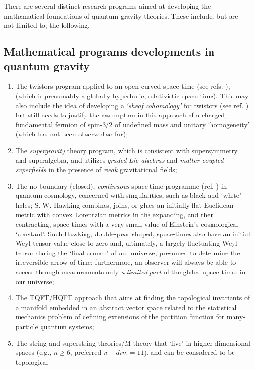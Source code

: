 \documentclass[12pt]{article}
\theoremstyle{plain}
\theoremstyle{definition}
\numberwithin{equation}{section}
\begin{document}
 There are several distinct research programs aimed at developing the mathematical foundations of
quantum gravity theories.  These include, but are not limited to, the following. 

\subsection{Mathematical programs developments in quantum gravity}
\begin{enumerate}
\item The twistors program applied to an open curved space-time (see refs. 
\cite{SH2k4, RP2k}), (which is presumably a globally hyperbolic, relativistic space-time). 
This may also include the idea of developing a \emph{`sheaf cohomology'} for twistors (see ref. 
\cite{RP2k}) but still needs to justify the assumption in this approach of a 
charged, fundamental fermion of spin-3/2 of undefined mass and unitary `homogeneity' (which 
has not been observed so far);
\item The \emph{supergravity} theory program, which is consistent with supersymmetry 
and superalgebra, and utilizes \emph{graded Lie algebras} and \emph{matter-coupled 
superfields} in the presence of \emph{weak} gravitational fields;
\item The no boundary (closed), \emph{continuous} space-time programme (ref. 
\cite{SH2k4}) in quantum cosmology, concerned with singularities, such as black 
and `white' holes; S. W. Hawking combines, joins, or glues an initially flat Euclidean 
metric with convex Lorentzian metrics in the expanding, and then contracting, space-times with 
a very small value of Einstein's cosmological `constant'. Such Hawking, double-pear shaped, 
space-times also have an initial Weyl tensor value close to zero and, ultimately, a largely 
fluctuating Weyl tensor during the `final crunch' of our universe, presumed to determine the 
irreversible arrow of time; furthermore, an observer will always be able to access through 
measurements only \emph{a limited part} of the global space-times in our universe; 
\item The TQFT/HQFT approach that aims at finding the topological invariants of a 
manifold embedded in an abstract vector space related to the statistical mechanics problem of 
defining extensions of the partition function for many-particle quantum systems; 
\item  The string and superstring theories/M-theory that `live' in higher dimensional 
spaces (e.g., $n\geq 6$, preferred $n-dim =11$), and can be considered to be topological 

\end{enumerate}
\end{document}
